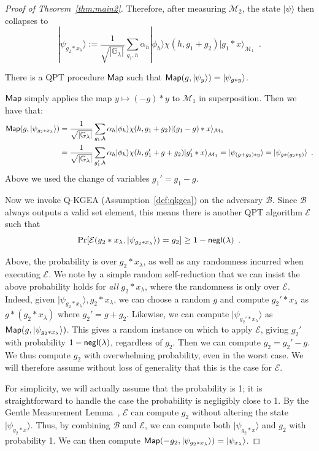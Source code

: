 \documentclass{article}\usepackage[a4paper,margin=20mm]{geometry}
\numberwithin{theorem}{section}
\numberwithin{equation}{section}
\newcommand{\G}{\mathbb{G}}
\newcommand{\Bs}{{\mathcal{B}}}
\newcommand{\Es}{{\mathcal{E}}}
\newcommand{\Ms}{{\mathcal{M}}}
\newcommand{\negl}{{\sf negl}}
\begin{document}
\begin{proof}[Proof of Theorem~\ref{thm:main2}]
	Therefore, after measuring $\Ms_2$, the state $|\psi\rangle$ then collapses to \[|\psi_{g_2*x_\lambda}\rangle:=\frac{1}{\sqrt{|\G_\lambda|}}\sum_{g_1,h}\alpha_h|\phi_h\rangle\chi(h,g_1+g_2)|g_1*x\rangle_{\Ms_1}\enspace .\]
	
	\begin{claim}There is a QPT procedure ${\sf Map}$ such that ${\sf Map}(g,|\psi_{y}\rangle)=|\psi_{g*y}\rangle$.
	\end{claim}
	\begin{subproof}${\sf Map}$ simply applies the map $y\mapsto (-g)*y$ to $\Ms_1$ in superposition. Then we have that:
		\begin{align*}
			{\sf Map}(g,|\psi_{g_2*x_\lambda}\rangle)&=\frac{1}{\sqrt{|\G_\lambda|}}\sum_{g_1,h}\alpha_h|\phi_h\rangle\chi(h,g_1+g_2)|(g_1-g)*x\rangle_{\Ms_1}\\
			&=\frac{1}{\sqrt{|\G_\lambda|}}\sum_{g_1',h}\alpha_h|\phi_h\rangle\chi(h,g_1'+g+g_2)|g_1'*x\rangle_{\Ms_1}=|\psi_{(g+g_2)*y}\rangle=|\psi_{g*(g_2*y)}\rangle\enspace .
		\end{align*}
		Above we used the change of variables $g_1'=g_1-g$.
	\end{subproof}
    
	Now we invoke Q-KGEA (Assumption~\ref{def:qkgea}) on the adversary $\Bs$. Since $\Bs$ always outputs a valid set element, this means there is another QPT algorithm $\Es$ such that 
	\[\Pr[\Es(g_2*x_\lambda,|\psi_{g_2*x_\lambda}\rangle)=g_2]\geq 1-\negl(\lambda)\enspace .\]
	
	Above, the probability is over $g_2*x_\lambda$, as well as any randomness incurred when executing $\Es$. We note by a simple random self-reduction that we can insist the above probability holds for \emph{all} $g_2*x_\lambda$, where the randomness is only over $\Es$. Indeed, given $|\psi_{g_2*x_\lambda}\rangle,g_2*x_\lambda$, we can choose a random $g$ and compute $g_2'*x_\lambda$ as $g*(g_2*x_\lambda)$ where $g_2'=g+g_2$. Likewise, we can compute $|\psi_{g_2'*x_\lambda}\rangle$ as ${\sf Map}(g,|\psi_{g_2*x_\lambda}\rangle)$. This gives a random instance on which to apply $\Es$, giving $g_2'$ with probability $1-\negl(\lambda)$, regardless of $g_2$. Then we can compute $g_2=g_2'-g$. We thus compute $g_2$ with overwhelming probability, even in the worst case. We will therefore assume without loss of generality that this is the case for $\Es$.
	
	For simplicity, we will actually assume that the probability is 1; it is straightforward to handle the case the probability is negligibly close to 1. By the Gentle Measurement Lemma~\cite{Winter99}, $\Es$ can compute $g_2$ without altering the state $|\psi_{g_2*x}\rangle$. Thus, by combining $\Bs$ and $\Es$, we can compute both $|\psi_{g_2*x}\rangle$ and $g_2$ with probability 1. We can then compute ${\sf Map}(-g_2,|\psi_{g_2*x_\lambda}\rangle)=|\psi_{x_\lambda}\rangle$.
	

\end{proof}
\end{document}
